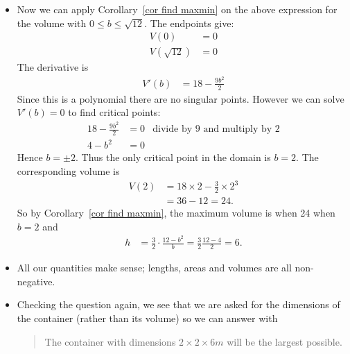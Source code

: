\begin{eg}
\begin{itemize}
\item Now we can apply Corollary~\ref{cor find maxmin} on the above expression for
the volume with $0 \leq b \leq \sqrt{12}$. The endpoints give:
\begin{align*}
  V(0) &= 0 \\
  V(\sqrt{12}) &= 0
\end{align*}
The derivative is
\begin{align*}
  V'(b) &= 18 - \frac{9b^2}{2}
\end{align*}
Since this is a polynomial there are no singular points. However we can solve $V'(b) = 0$
to find critical points:
\begin{align*}
  18 - \frac{9b^2}{2} &= 0  & \text{divide by 9 and multiply by 2}\\
  4 - b^2 &= 0
\end{align*}
Hence $b = \pm 2$. Thus the only critical point in the domain is $b=2$. The corresponding
volume is
\begin{align*}
V(2) &= 18\times2 - \frac{3}{2} \times 2^3 \\
  &= 36 - 12 = 24.
\end{align*}
So by Corollary~\ref{cor find maxmin}, the maximum volume is when 24 when $b=2$ and
\begin{align*}
  h &= \frac{3}{2} \cdot \frac{12-b^2}{b} = \frac{3}{2} \frac{12-4}{2} = 6.
\end{align*}
\item All our quantities make sense; lengths, areas and volumes are all non-negative.
\item Checking the question again, we see that we are asked for the dimensions of the
container (rather than its volume) so we can answer with
\begin{quote}
 The container with dimensions $2 \times 2 \times 6m$ will be the largest possible.
\end{quote}
\end{itemize}
\end{eg}


